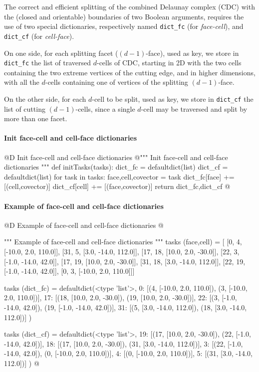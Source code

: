 \documentclass[11pt,oneside]{article}	%
\begin{document}
The correct and efficient splitting of the combined Delaunay complex (CDC) with the  (closed and orientable) boundaries of two Boolean arguments, requires the use of two special dictionaries, respectively named \texttt{dict\_fc} (for \emph{face-cell}), and \texttt{dict\_cf} (for \emph{cell-face}).
 
On one side, for each splitting facet ($(d-1)$-face), used as key, we store in \texttt{dict\_fc} the list of traversed $d$-cells of CDC, starting in 2D with the two cells containing the two extreme vertices of the cutting edge, and in higher dimensions, with all the $d$-cells containing one of vertices of the splitting $(d-1)$-face.

On the other side, for each $d$-cell to be split, used as key, we store in \texttt{dict\_cf} the list of cutting $(d-1)$-cells, since a single $d$-cell may be traversed and split by more than one facet. 


\paragraph{Init face-cell and cell-face dictionaries}

@D Init face-cell and cell-face dictionaries
@{""" Init face-cell and cell-face dictionaries """
def initTasks(tasks):
	dict_fc = defaultdict(list)
	dict_cf = defaultdict(list)
	for task in tasks:
		face,cell,covector = task
		dict_fc[face] += [(cell,covector)] 
		dict_cf[cell] += [(face,covector)] 
	return dict_fc,dict_cf
@}

\paragraph{Example of face-cell and cell-face dictionaries}

@D Example of face-cell and cell-face dictionaries
@{""" Example of face-cell and cell-face dictionaries """
tasks (face,cell) = [
 [0, 4, [-10.0, 2.0, 110.0]],
 [31, 5, [3.0, -14.0, 112.0]],
 [17, 18, [10.0, 2.0, -30.0]],
 [22, 3, [-1.0, -14.0, 42.0]],
 [17, 19, [10.0, 2.0, -30.0]],
 [31, 18, [3.0, -14.0, 112.0]],
 [22, 19, [-1.0, -14.0, 42.0]],
 [0, 3, [-10.0, 2.0, 110.0]]]

tasks (dict_fc) = defaultdict(<type 'list'>, {
  0: [(4, [-10.0, 2.0, 110.0]), (3, [-10.0, 2.0, 110.0])],
 17: [(18, [10.0, 2.0, -30.0]), (19, [10.0, 2.0, -30.0])],
 22: [(3, [-1.0, -14.0, 42.0]), (19, [-1.0, -14.0, 42.0])],
 31: [(5, [3.0, -14.0, 112.0]), (18, [3.0, -14.0, 112.0])]  })

tasks (dict_cf) = defaultdict(<type 'list'>, {
 19: [(17, [10.0, 2.0, -30.0]), (22, [-1.0, -14.0, 42.0])],
 18: [(17, [10.0, 2.0, -30.0]), (31, [3.0, -14.0, 112.0])],
  3: [(22, [-1.0, -14.0, 42.0]), (0, [-10.0, 2.0, 110.0])],
  4: [(0, [-10.0, 2.0, 110.0])],
  5: [(31, [3.0, -14.0, 112.0])]  })
@}
\end{document}
